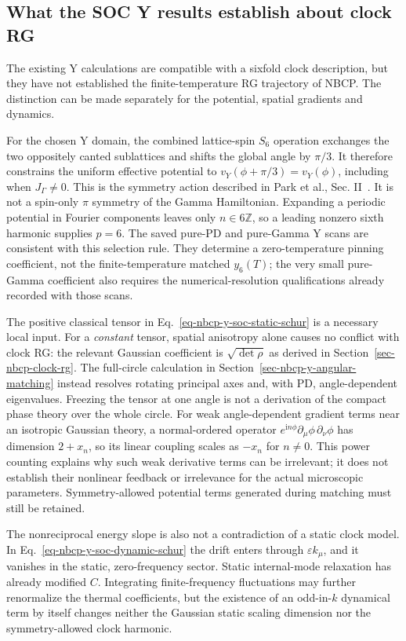 \subsection{What the SOC Y results establish about clock
RG}\label{sec-nbcp-y-rg-status}

The existing Y calculations are compatible with a sixfold clock
description, but they have not established the finite-temperature RG
trajectory of NBCP. The distinction can be made separately for the
potential, spatial gradients and dynamics.

For the chosen Y domain, the combined lattice-spin \(S_6\) operation
exchanges the two oppositely canted sublattices and shifts the global
angle by \(\pi/3\). It therefore constrains the uniform effective
potential to \(v_Y(\phi+\pi/3)=v_Y(\phi)\), including when
\(J_\Gamma\ne0\). This is the symmetry action described in
Park et al., Sec. II~\cite{park2026}. It is
not a spin-only \(\pi\) symmetry of the Gamma Hamiltonian. Expanding a
periodic potential in Fourier components leaves only \(n\in6\mathbb Z\),
so a leading nonzero sixth harmonic supplies \(p=6\). The saved pure-PD
and pure-Gamma Y scans are consistent with this selection rule. They
determine a zero-temperature pinning coefficient, not the
finite-temperature matched \(y_6(T)\); the very small pure-Gamma
coefficient also requires the numerical-resolution qualifications
already recorded with those scans.

The positive classical tensor in Eq.~\ref{eq-nbcp-y-soc-static-schur} is
a necessary local input. For a \emph{constant} tensor, spatial
anisotropy alone causes no conflict with clock RG: the relevant Gaussian
coefficient is \(\sqrt{\det\rho}\) as derived in
Section~\ref{sec-nbcp-clock-rg}. The full-circle calculation in
Section~\ref{sec-nbcp-y-angular-matching} instead resolves rotating
principal axes and, with PD, angle-dependent eigenvalues. Freezing the
tensor at one angle is not a derivation of the compact phase theory over
the whole circle. For weak angle-dependent gradient terms near an
isotropic Gaussian theory, a normal-ordered operator
\(e^{\mathrm in\phi}\partial_\mu\phi\,\partial_\nu\phi\) has dimension
\(2+x_n\), so its linear coupling scales as \(-x_n\) for \(n\ne0\). This
power counting explains why such weak derivative terms can be
irrelevant; it does not establish their nonlinear feedback or
irrelevance for the actual microscopic parameters. Symmetry-allowed
potential terms generated during matching must still be retained.

The nonreciprocal energy slope is also not a contradiction of a static
clock model. In Eq.~\ref{eq-nbcp-y-soc-dynamic-schur} the drift enters
through \(\varepsilon k_\mu\), and it vanishes in the static,
zero-frequency sector. Static internal-mode relaxation has already
modified \(C\). Integrating finite-frequency fluctuations may further
renormalize the thermal coefficients, but the existence of an
odd-in-\(k\) dynamical term by itself changes neither the Gaussian
static scaling dimension nor the symmetry-allowed clock harmonic.

